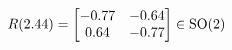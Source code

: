 \documentclass[preview]{standalone}
\begin{document}
\begin{align*}
\special{dvisvgm:raw <g id='unique000'>}R(2.44) = \begin{bmatrix} -0.77 & -0.64 \\ 0.64 & -0.77 \end{bmatrix} \in \text{SO}(2)\special{dvisvgm:raw </g>}
\end{align*}
\end{document}
